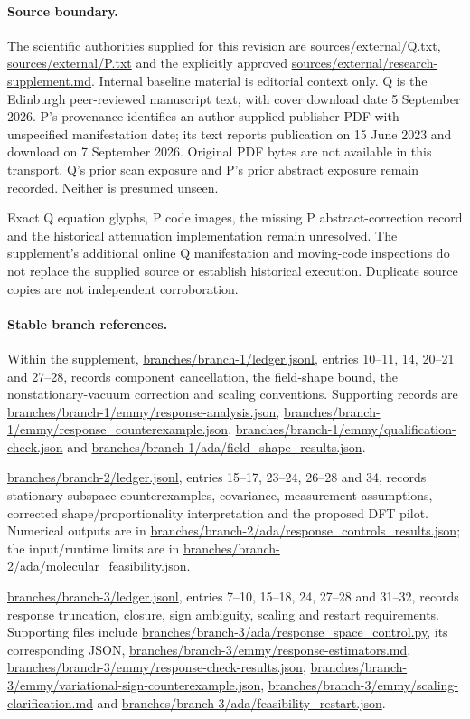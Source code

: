 \documentclass{article}
\begin{document}
\paragraph{Source boundary.}
The scientific authorities supplied for this revision are \url{sources/external/Q.txt}, \url{sources/external/P.txt} and the explicitly approved \url{sources/external/research-supplement.md}. Internal baseline material is editorial context only. Q is the Edinburgh peer-reviewed manuscript text, with cover download date 5 September 2026. P's provenance identifies an author-supplied publisher PDF with unspecified manifestation date; its text reports publication on 15 June 2023 and download on 7 September 2026. Original PDF bytes are not available in this transport. Q's prior scan exposure and P's prior abstract exposure remain recorded. Neither is presumed unseen.

Exact Q equation glyphs, P code images, the missing P abstract-correction record and the historical attenuation implementation remain unresolved. The supplement's additional online Q manifestation and moving-code inspections do not replace the supplied source or establish historical execution. Duplicate source copies are not independent corroboration.

\paragraph{Stable branch references.}
Within the supplement, \url{branches/branch-1/ledger.jsonl}, entries 10--11, 14, 20--21 and 27--28, records component cancellation, the field-shape bound, the nonstationary-vacuum correction and scaling conventions. Supporting records are \url{branches/branch-1/emmy/response-analysis.json}, \url{branches/branch-1/emmy/response_counterexample.json}, \url{branches/branch-1/emmy/qualification-check.json} and \url{branches/branch-1/ada/field_shape_results.json}.

\url{branches/branch-2/ledger.jsonl}, entries 15--17, 23--24, 26--28 and 34, records stationary-subspace counterexamples, covariance, measurement assumptions, corrected shape/proportionality interpretation and the proposed DFT pilot. Numerical outputs are in \url{branches/branch-2/ada/response_controls_results.json}; the input/runtime limits are in \url{branches/branch-2/ada/molecular_feasibility.json}.

\url{branches/branch-3/ledger.jsonl}, entries 7--10, 15--18, 24, 27--28 and 31--32, records response truncation, closure, sign ambiguity, scaling and restart requirements. Supporting files include \url{branches/branch-3/ada/response_space_control.py}, its corresponding JSON, \url{branches/branch-3/emmy/response-estimators.md}, \url{branches/branch-3/emmy/response-check-results.json}, \url{branches/branch-3/emmy/variational-sign-counterexample.json}, \url{branches/branch-3/emmy/scaling-clarification.md} and \url{branches/branch-3/ada/feasibility_restart.json}.
\end{document}
